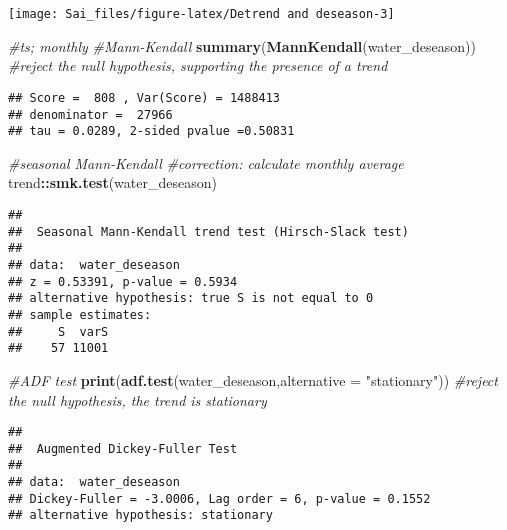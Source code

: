 \documentclass[
]{article}
\newenvironment{Shaded}{\begin{snugshade}}{\end{snugshade}}
\newcommand{\AttributeTok}[1]{\textcolor[rgb]{0.13,0.29,0.53}{#1}}
\newcommand{\CommentTok}[1]{\textcolor[rgb]{0.56,0.35,0.01}{\textit{#1}}}
\newcommand{\FunctionTok}[1]{\textcolor[rgb]{0.13,0.29,0.53}{\textbf{#1}}}
\newcommand{\NormalTok}[1]{#1}
\newcommand{\SpecialCharTok}[1]{\textcolor[rgb]{0.81,0.36,0.00}{\textbf{#1}}}
\newcommand{\StringTok}[1]{\textcolor[rgb]{0.31,0.60,0.02}{#1}}
\begin{document}
\begin{center}\texttt{[image: Sai\_files/figure-latex/Detrend and deseason-3]} \end{center}

\begin{Shaded}
\begin{Highlighting}[]
\CommentTok{\#ts; monthly }
\CommentTok{\#Mann{-}Kendall}
\FunctionTok{summary}\NormalTok{(}\FunctionTok{MannKendall}\NormalTok{(water\_deseason)) }\CommentTok{\#reject the null hypothesis, supporting the presence of a trend}
\end{Highlighting}
\end{Shaded}

\begin{verbatim}
## Score =  808 , Var(Score) = 1488413
## denominator =  27966
## tau = 0.0289, 2-sided pvalue =0.50831
\end{verbatim}

\begin{Shaded}
\begin{Highlighting}[]
\CommentTok{\#seasonal Mann{-}Kendall}
\CommentTok{\#correction: calculate monthly average }
\NormalTok{trend}\SpecialCharTok{::}\FunctionTok{smk.test}\NormalTok{(water\_deseason) }
\end{Highlighting}
\end{Shaded}

\begin{verbatim}
## 
##  Seasonal Mann-Kendall trend test (Hirsch-Slack test)
## 
## data:  water_deseason
## z = 0.53391, p-value = 0.5934
## alternative hypothesis: true S is not equal to 0
## sample estimates:
##     S  varS 
##    57 11001
\end{verbatim}

\begin{Shaded}
\begin{Highlighting}[]
\CommentTok{\#ADF test}
\FunctionTok{print}\NormalTok{(}\FunctionTok{adf.test}\NormalTok{(water\_deseason,}\AttributeTok{alternative =} \StringTok{"stationary"}\NormalTok{)) }\CommentTok{\#reject the null hypothesis, the trend is stationary }
\end{Highlighting}
\end{Shaded}

\begin{verbatim}
## 
##  Augmented Dickey-Fuller Test
## 
## data:  water_deseason
## Dickey-Fuller = -3.0006, Lag order = 6, p-value = 0.1552
## alternative hypothesis: stationary
\end{verbatim}
\end{document}
